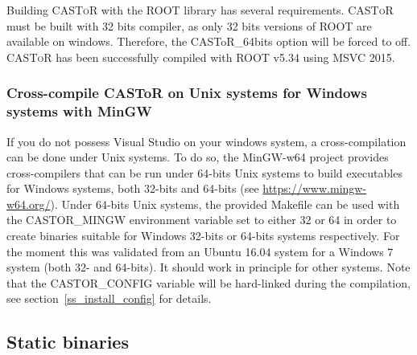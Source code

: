 \documentclass[a4paper, 11pt]{article}
\newcommand{\castor}{\textsc{CASToR}\xspace}
\begin{document}
Building \castor with the ROOT library has several requirements. \castor must be built with 32 bits compiler, as only 32 bits versions of ROOT are available on windows. Therefore, the CASToR\_64bits option will be forced to off. \castor has been successfully compiled with ROOT v5.34 using MSVC 2015.

\subsubsection{Cross-compile CASToR on Unix systems for Windows systems with MinGW}
\label{sss_install_win_cross}

If you do not possess Visual Studio on your windows system, a cross-compilation can be done under Unix systems. To do so, the MinGW-w64 project provides
cross-compilers that can be run under 64-bits Unix systems to build executables for Windows systems, both 32-bits and 64-bits (see \url{https://www.mingw-w64.org/}).
Under 64-bits Unix systems, the provided Makefile can be used with the CASTOR\_MINGW environment variable set to either 32 or 64 in order to create binaries suitable
for Windows 32-bits or 64-bits systems respectively. For the moment this was validated from an Ubuntu 16.04 system for a Windows 7 system (both 32- and 64-bits).
It should work in principle for other systems. Note that the CASTOR\_CONFIG variable will be hard-linked during the compilation, see section~\ref{ss_install_config}
for details.

\subsection{Static binaries}
\label{ss_install_static_bin}
\end{document}
